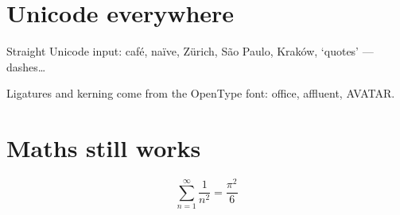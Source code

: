 \documentclass[11pt]{article}
\begin{document}
\section*{Unicode everywhere}
Straight Unicode input: café, naïve, Zürich, São Paulo, Kraków, ‘quotes’ — dashes…

Ligatures and kerning come from the OpenType font: office, affluent, AVATAR.

\section*{Maths still works}
\[
  \sum_{n=1}^{\infty} \frac{1}{n^2} = \frac{\pi^2}{6}
\]
\end{document}
